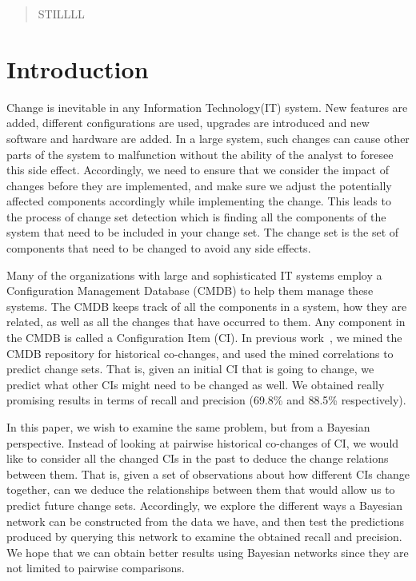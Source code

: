 \documentclass{article}
\begin{document}
 


\begin{abstract} 
STILLLL
\end{abstract} 

\section{Introduction}
\label{intro}

Change is inevitable in any Information Technology(IT) system. New features are added, different configurations are used, upgrades are introduced and new
software and hardware are added. In a large system, such changes can cause other parts of the system to malfunction without the ability of the analyst to
foresee this side effect. Accordingly, we need to ensure that we consider the impact of changes before they are implemented, and make sure we adjust the
potentially affected components accordingly while implementing the change. This leads to the process of change set detection which is finding all the
components of the system that need to be included in your change set. The change set is the set of components that need to be changed to avoid any side
effects. 

Many of the organizations with large and sophisticated IT systems employ a Configuration Management Database (CMDB) to help them manage these systems.
The CMDB keeps track of all the components in a system, how they are related, as well as all the changes that have occurred to them. Any component in the CMDB
is called a Configuration Item (CI). In previous work~\cite{nadi2010}, we mined the CMDB repository for historical co-changes, and used the mined correlations
to predict change sets. That is, given an initial CI that is going to change, we predict what other CIs might need to be changed as well. We obtained really
promising results in terms of recall and precision (69.8\% and 88.5\% respectively). 

In this paper, we wish to examine the same problem, but from a Bayesian perspective. Instead of looking at pairwise historical co-changes of CI, we would like
to consider all the changed CIs in the past to deduce the change relations between them. That is, given a set of observations about how different CIs change
together, can we deduce the relationships between them that would allow us to predict future change sets. Accordingly, we explore the different ways a Bayesian
network can be constructed from the data we have, and then test the predictions produced by querying this network to examine the obtained recall and precision.
We hope that we can obtain better results using Bayesian networks since they are not limited to pairwise comparisons. 
\end{document}
